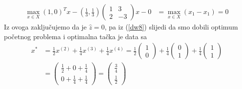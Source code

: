 \documentclass[a4paper, utf8, 11pt, colorlinks]{book}
\begin{document}
	 \begin{align*}
		\max_{x \in X} (1, 0)^T x - (\frac{1}{3}, \frac{1}{3})\left(\begin{array}{cc}
			1 & 3 \\
			2 & -3
		\end{array}\right)  x   - 0 &= \max_{x \in X} (x_1  - x_1 ) = 0    
	\end{align*} 
  Iz ovoga zaključujemo da je $\hat{z}=0$, pa iz (\ref{dw8}) slijedi da smo dobili optimum početnog problema i optimalna tačka je data sa 
\begin{align*}
  	 x^* &= \frac{1}{2}  x^{(2)}+ \frac{1}{4} x^{(3)} + \frac{1}{4} x^{(4)} 
  	     = \frac{1}{2} \begin{pmatrix}
  	     	      1 \\
  	     	      0
  	     \end{pmatrix} +
       \frac{1}{4} \begin{pmatrix}
       	                  0 \\
       	                  1
       \end{pmatrix} +
   \frac{1}{4} \begin{pmatrix}
   	                  1 \\
   	                  1
   \end{pmatrix}\\
   &= \begin{pmatrix}
   	        \frac{1}{2} + 0 + \frac{1}{4} \\
   	        0 + \frac{1}{4} + \frac{1}{4}
   \end{pmatrix} = \begin{pmatrix}
         \frac{3}{4} \\
         \frac{1}{2}
  \end{pmatrix}
\end{align*}
\vspace{1cm} \\
\end{document}
